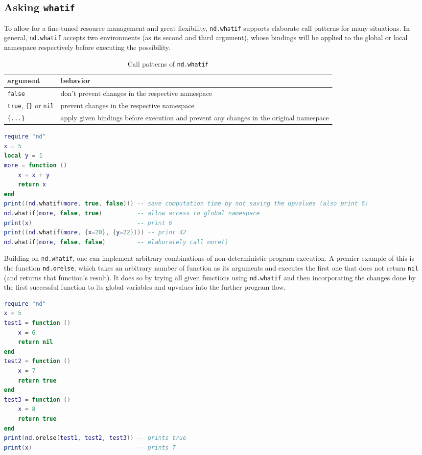 \subsection{Asking \texttt{whatif}}
\label{sec:whatif}

To allow for a fine-tuned resource management and great flexibility, \texttt{nd.whatif} supports elaborate call patterns for many situations. In general, \texttt{nd.whatif} accepts two environments (as its second and third argument), whose bindings will be applied to the global or local namespace respectively before executing the possibility.

 \begin{table}[h]
 \caption{Call patterns of \texttt{nd.whatif}}
 \begin{tabular}{l|p{}}
argument  & behavior\\
\hline
\texttt{false} & don't prevent changes in the respective namespace\\
\texttt{true}, \texttt{\{\}} or \texttt{nil} & prevent changes in the respective namespace \\
\texttt{\{...\}} & apply given bindings before execution and prevent any changes in the original namespace\\
 \end{tabular}
 \label{tab:whatif}
 \end{table}

\begin{lstlisting}[language=lua, caption={Example for the call patterns of \texttt{nd.whatif} (see table \ref{tab:whatif})}, label=lst:whatif, name=lst:whatif]
require "nd"
x = 5
local y = 1
more = function ()
	x = x + y
	return x
end
print((nd.whatif(more, true, false))) -- save computation time by not saving the upvalues (also print 6)
nd.whatif(more, false, true)          -- allow access to global namespace
print(x)                              -- print 6
print((nd.whatif(more, {x=20}, {y=22}))) -- print 42
nd.whatif(more, false, false)         -- elaborately call more()
\end{lstlisting}

Building on \texttt{nd.whatif}, one can implement arbitrary combinations of non-deterministic program execution. A premier example of this is the function \texttt{nd.orelse}, which takes an arbitrary number of function as its arguments and executes the first one that does not return \texttt{nil} (and returns that function's result). It does so by trying all given functions using \texttt{nd.whatif} and then incorporating the changes done by the first successful function to its global variables and upvalues into the further program flow.


\begin{lstlisting}[language=lua, caption={Using \texttt{nd.orelse}.}, label=lst:orelse, name=lst:orelse]
require "nd"
x = 5
test1 = function ()
	x = 6
	return nil
end
test2 = function ()
	x = 7
	return true
end
test3 = function ()
	x = 8
	return true
end
print(nd.orelse(test1, test2, test3)) -- prints true
print(x)                              -- prints 7
\end{lstlisting}
